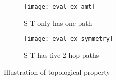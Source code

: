 \begin{figure}
    \centering
    \begin{subfigure}[b]{0.22\textwidth}
        \centering
        \texttt{[image: eval\_ex\_amt]}
        \caption{S-T only has one path}
        \label{fig:opt_analysis_amt}
    \end{subfigure}
    \hfill
    \begin{subfigure}[b]{0.22\textwidth}
        \centering
        \texttt{[image: eval\_ex\_symmetry]}
        \caption{S-T has five 2-hop paths}
        \label{fig:opt_analysis_symmetry}
    \end{subfigure}
       \caption{Illustration of topological property}
       \label{fig:opt_analysis}
\end{figure}

